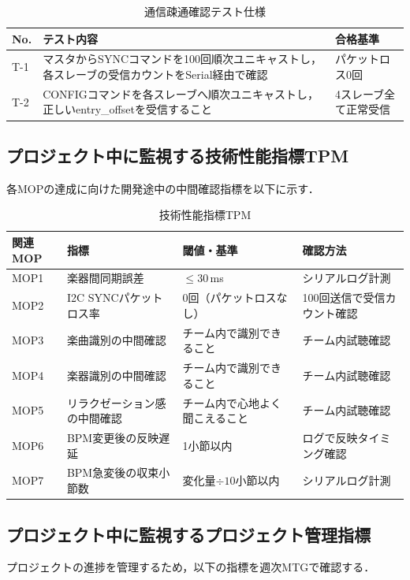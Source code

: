\documentclass[lualatex,book,paper=a4paper,jafontsize=11.5pt,jafontscale=1.05]{jlreq}
\begin{document}
\begin{table}[htbp]
\centering
\begin{tabular}{L{0.8cm}L{9.7cm}L{3cm}}
  \toprule
  \textbf{No.} & \textbf{テスト内容} & \textbf{合格基準} \\
  \midrule
  T-1 & マスタからSYNCコマンドを100回順次ユニキャストし，各スレーブの受信カウントをSerial経由で確認 & パケットロス0回 \\
  T-2 & CONFIGコマンドを各スレーブへ順次ユニキャストし，正しいentry\_offsetを受信すること & 4スレーブ全て正常受信 \\
  \bottomrule
\end{tabular}
\caption{通信疎通確認テスト仕様}
\label{tab:test220}
\end{table}


\subsection{プロジェクト中に監視する技術性能指標TPM}
各MOPの達成に向けた開発途中の中間確認指標を以下に示す．

\begin{table}[htbp]
\centering
\begin{tabular}{L{2cm}L{4cm}L{4cm}L{4.5cm}}
  \toprule
  \textbf{関連MOP} & \textbf{指標} & \textbf{閾値・基準} & \textbf{確認方法} \\
  \midrule
  MOP1 & 楽器間同期誤差 & $\leq 30$\,ms & シリアルログ計測 \\
  MOP2 & I2C SYNCパケットロス率 & 0回（パケットロスなし） & 100回送信で受信カウント確認 \\
  MOP3 & 楽曲識別の中間確認 & チーム内で識別できること & チーム内試聴確認 \\
  MOP4 & 楽器識別の中間確認 & チーム内で識別できること & チーム内試聴確認 \\
  MOP5 & リラクゼーション感の中間確認 & チーム内で心地よく聞こえること & チーム内試聴確認 \\
  MOP6 & BPM変更後の反映遅延 & 1小節以内 & ログで反映タイミング確認 \\
  MOP7 & BPM急変後の収束小節数 & 変化量$\div 10$小節以内 & シリアルログ計測 \\
  \bottomrule
\end{tabular}
\caption{技術性能指標TPM}
\label{tab:tpm}
\end{table}

\subsection{プロジェクト中に監視するプロジェクト管理指標}
プロジェクトの進捗を管理するため，以下の指標を週次MTGで確認する．
\end{document}
